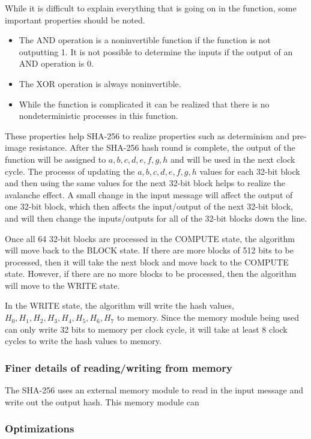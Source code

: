 \documentclass{article}
\begin{document}
While it is difficult to explain everything that is going on in the function, some important properties should be noted.
\begin{itemize}
  \item The AND operation is a noninvertible function if the function is not outputting 1. It is not possible to determine the inputs if the output of an AND operation is 0.
  \item The XOR operation is always noninvertible.
  \item While the function is complicated it can be realized that there is no nondeterministic processes in this function.
\end{itemize}
These properties help SHA-256 to realize properties such as determinism and pre-image resistance. After the SHA-256 hash round is complete, the output of the function will be assigned to $a,b,c,d,e,f,g,h$ and will be used in the next clock cycle. The processs of updating the $a,b,c,d,e,f,g,h$ values for each 32-bit block and then using the same values for the next 32-bit block helps to realize the avalanche effect. A small change in the input message will affect the output of one 32-bit block, which then affects the input/output of the next 32-bit block, and will then change the inputs/outputs for all of the 32-bit blocks down the line.

Once all 64 32-bit blocks are processed in the COMPUTE state, the algorithm will move back to the BLOCK state. If there are more blocks of 512 bits to be processed, then it will take the next block and move back to the COMPUTE state. However, if there are no more blocks to be processed, then the algorithm will move to the WRITE state.

In the WRITE state, the algorithm will write the hash values, $H_0, H_1, H_2, H_3, H_4, H_5, H_6, H_7$ to memory. Since the memory module being used can only write 32 bits to memory per clock cycle, it will take at least 8 clock cycles to write the hash values to memory.

\subsubsection{Finer details of reading/writing from memory}

The SHA-256 uses an external memory module to read in the input message and write out the output hash. This memory module can

\subsubsection{Optimizations}
\end{document}
